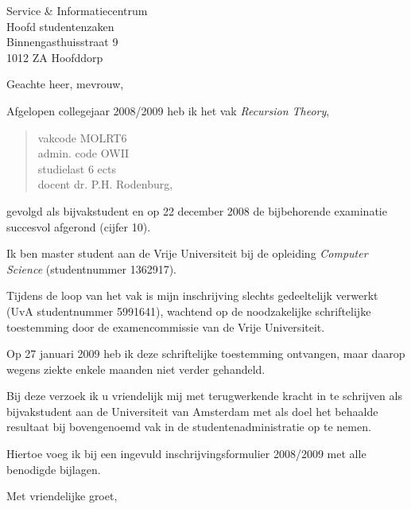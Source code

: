 \documentclass[a4paper,11pt]{brief}
\date{8 juli 2009}
\begin{document}
\begin{letter}{Service \& Informatiecentrum\\
Hoofd studentenzaken\\
Binnengasthuisstraat 9\\
1012 ZA Hoofddorp}

\opening{Geachte heer, mevrouw,}

Afgelopen collegejaar 2008/2009 heb ik het vak \emph{Recursion Theory},
\begin{quote}
vakcode MOLRT6\\
admin. code OWII\\
studielast 6 ects\\
docent dr. P.H. Rodenburg,
\end{quote}
gevolgd als bijvakstudent en op 22 december 2008 de bijbehorende
examinatie succesvol afgerond (cijfer 10).

Ik ben master student aan de Vrije Universiteit bij de opleiding
\emph{Computer Science} (studentnummer 1362917).

Tijdens de loop van het vak is mijn inschrijving slechts gedeeltelijk
verwerkt (UvA studentnummer 5991641), wachtend op de noodzakelijke
schriftelijke toestemming door de examencommissie van de Vrije
Universiteit.

Op 27 januari 2009 heb ik deze schriftelijke toestemming ontvangen,
maar daarop wegens ziekte enkele maanden niet verder gehandeld.

Bij deze verzoek ik u vriendelijk mij met terugwerkende kracht in te
schrijven als bijvakstudent aan de Universiteit van Amsterdam met als
doel het behaalde resultaat bij bovengenoemd vak in de studentenadministratie
op te nemen.

Hiertoe voeg ik bij een ingevuld inschrijvingsformulier 2008/2009 met
alle benodigde bijlagen.

\closing{Met vriendelijke groet,}

\end{letter}
\end{document}
